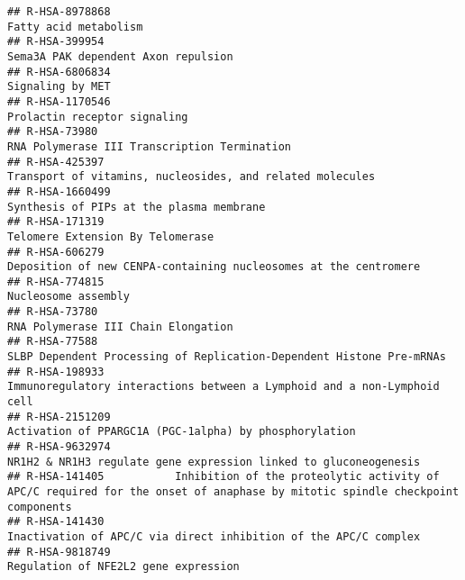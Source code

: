 \documentclass[
]{article}
\begin{document}
\begin{verbatim}
## R-HSA-8978868                                                                                                                Fatty acid metabolism
## R-HSA-399954                                                                                                   Sema3A PAK dependent Axon repulsion
## R-HSA-6806834                                                                                                                     Signaling by MET
## R-HSA-1170546                                                                                                         Prolactin receptor signaling
## R-HSA-73980                                                                                           RNA Polymerase III Transcription Termination
## R-HSA-425397                                                                             Transport of vitamins, nucleosides, and related molecules
## R-HSA-1660499                                                                                             Synthesis of PIPs at the plasma membrane
## R-HSA-171319                                                                                                      Telomere Extension By Telomerase
## R-HSA-606279                                                                      Deposition of new CENPA-containing nucleosomes at the centromere
## R-HSA-774815                                                                                                                   Nucleosome assembly
## R-HSA-73780                                                                                                    RNA Polymerase III Chain Elongation
## R-HSA-77588                                                                   SLBP Dependent Processing of Replication-Dependent Histone Pre-mRNAs
## R-HSA-198933                                                              Immunoregulatory interactions between a Lymphoid and a non-Lymphoid cell
## R-HSA-2151209                                                                               Activation of PPARGC1A (PGC-1alpha) by phosphorylation
## R-HSA-9632974                                                                    NR1H2 & NR1H3 regulate gene expression linked to gluconeogenesis 
## R-HSA-141405           Inhibition of the proteolytic activity of APC/C required for the onset of anaphase by mitotic spindle checkpoint components
## R-HSA-141430                                                                      Inactivation of APC/C via direct inhibition of the APC/C complex
## R-HSA-9818749                                                                                                 Regulation of NFE2L2 gene expression

\end{verbatim}
\end{document}
